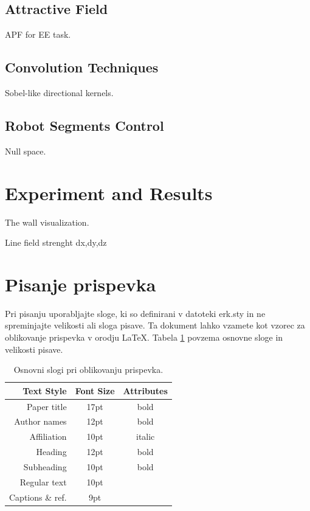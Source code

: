 \documentclass[a4paper]{article}
\begin{document}
\subsection{Attractive Field}

APF for EE task.

\subsection{Convolution Techniques}

Sobel-like directional kernels.

\subsection{Robot Segments Control}

Null space.

\section{Experiment and Results}

The wall visualization.

Line field strenght dx,dy,dz

\section{Pisanje prispevka}

Pri pisanju uporabljajte sloge, ki so definirani v datoteki erk.sty in ne spreminjajte velikosti ali sloga pisave. Ta dokument lahko vzamete kot vzorec za oblikovanje prispevka v orodju \LaTeX.
Tabela \ref{tab1} povzema osnovne sloge in velikosti pisave.

\begin{table}[h]
\caption{Osnovni slogi pri oblikovanju prispevka.} \label{tab1}
\smallskip
\begin{center}
\begin{tabular}{ | r | c | c | }
\hline  
  \textbf{Text Style} & \textbf{Font Size} & \textbf{Attributes}\\ 
\hline  
  Paper title & 17pt & bold\\
  Author names & 12pt & bold\\
  Affiliation & 10pt & italic\\
  Heading & 12pt & bold \\
  Subheading & 10pt & bold\\
  Regular text & 10pt &\\
  Captions \& ref. & 9pt &\\
\hline  
\end{tabular}
\end{center}
\end{table}
\end{document}
